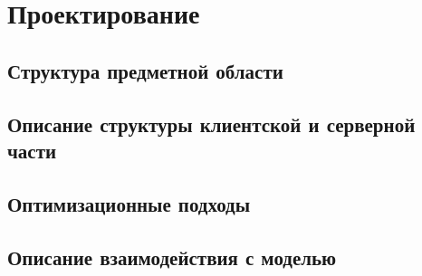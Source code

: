 ﻿\section{Проектирование}

\subsection{Структура предметной области}
\lipsum[4]

\subsection{Описание структуры клиентской и серверной части}
\lipsum[5]

\subsection{Оптимизационные подходы}
\lipsum[6]

\subsection{Описание взаимодействия с моделью}
\lipsum[7]